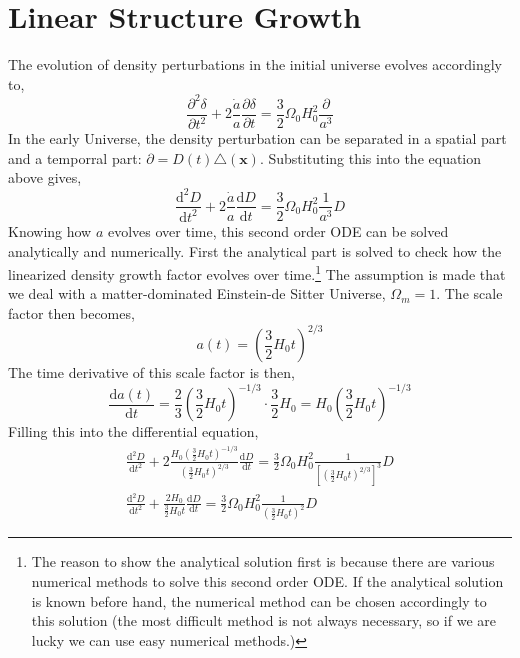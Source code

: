 \section{Linear Structure Growth}

The evolution of density perturbations in the initial universe evolves accordingly to,
\begin{equation*}
\frac{\partial^2 \delta}{\partial t^2}  + 2 \frac{\dot{a}}{a}\frac{\partial \delta}{\partial t} = \frac{3}{2} \Omega_0 H_0^2 \frac{\partial}{a^3}
\end{equation*}
In the early Universe, the density perturbation can be separated in a spatial part and a temporral part: $\partial = D(t)\triangle(\textbf{x})$. Substituting this into the equation above gives,
\begin{equation*}
\frac{\mathrm{d}^2 D}{\mathrm{d}t^2} + 2\frac{\dot{a}}{a}\frac{\mathrm{d}D}{\mathrm{d}t} = \frac{3}{2}\Omega_0H_0^2\frac{1}{a^3}D
\end{equation*}
Knowing how $a$ evolves over time, this second order ODE can be solved analytically and numerically. First the analytical part is solved to check how the linearized density growth factor evolves over time.\footnote{The reason to show the analytical solution first is because there are various numerical methods to solve this second order ODE. If the analytical solution is known before hand, the numerical method can be chosen accordingly to this solution (the most difficult method is not always necessary, so if we are lucky we can use easy numerical methods.)} The assumption is made that we deal with a matter-dominated Einstein-de Sitter Universe, $\Omega_m = 1$. The scale factor then becomes,
\begin{equation*}
a(t) = \left(\frac{3}{2}H_0 t\right)^{2/3}
\end{equation*}
The time derivative of this scale factor is then,
\begin{equation*}
\frac{\mathrm{d}a(t)}{\mathrm{d}t} = \frac{2}{3}\left(\frac{3}{2}H_0t\right)^{-1/3}\cdot \frac{3}{2} H_0 = H_0 \left(\frac{3}{2}H_0 t\right)^{-1/3}
\end{equation*}
Filling this into the differential equation,
\begin{gather*}
\frac{\mathrm{d}^2D}{\mathrm{d}t^2} + 2 \frac{ H_0 \left(\frac{3}{2}H_0 t\right)^{-1/3}}{ \left(\frac{3}{2}H_0 t\right)^{2/3}}\frac{\mathrm{d}D}{\mathrm{d}t} = \frac{3}{2}\Omega_0 H_0^2 \frac{1}{ \left[\left(\frac{3}{2}H_0 t\right)^{2/3}\right]^3} D \\
\frac{\mathrm{d}^2 D}{\mathrm{d}t^2 }+ \frac{2 H_0}{\frac{3}{2}H_0 t}\frac{\mathrm{d}D}{\mathrm{d}t} = \frac{3}{2}\Omega_0 H_0^2 \frac{1}{\left(\frac{3}{2}H_0 t\right)^2} D
\end{gather*}
